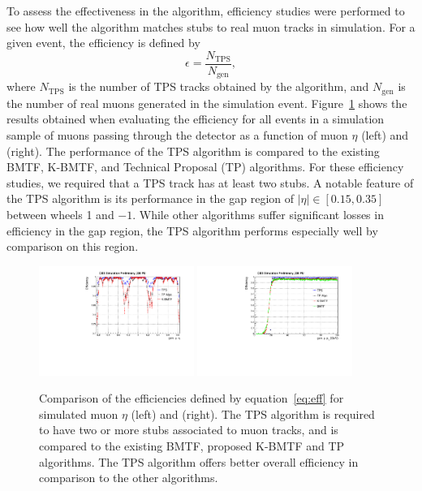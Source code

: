 To assess the effectiveness in the algorithm, efficiency studies were performed to see how well the algorithm matches stubs to real muon tracks in simulation.
For a given event, the efficiency is defined by
\begin{equation}\label{eq:eff}
  \epsilon=\frac{N_\mathrm{TPS}}{N_\mathrm{gen}},
\end{equation}
where $N_\mathrm{TPS}$ is the number of TPS tracks obtained by the algorithm, and $N_\mathrm{gen}$ is the number of real muons generated in the simulation event.
Figure~\ref{fig:eff} shows the results obtained when evaluating the efficiency for all events in a simulation sample of muons passing through the detector as a function of muon $\eta$ (left) and \pt (right).
The performance of the TPS algorithm is compared to the existing BMTF, K-BMTF, and Technical Proposal (TP) algorithms.
For these efficiency studies, we required that a TPS track has at least two stubs.
A notable feature of the TPS algorithm is its performance in the gap region of $|\eta|\in[0.15,0.35]$ between wheels 1 and $-1$.
While other algorithms suffer significant losses in efficiency in the gap region, the TPS algorithm performs especially well by comparison on this region.

\begin{figure}[htbp] %
  \centering
  \includegraphics[width=0.45\textwidth]{fig/TPS/effEta20GeV.pdf}
  \includegraphics[width=0.45\textwidth]{fig/TPS/effPt20GeV.pdf}
  \caption{
    Comparison of the efficiencies defined by equation~\ref{eq:eff} for simulated muon $\eta$ (left) and \pt (right).
    The TPS algorithm is required to have two or more stubs associated to muon tracks, and is compared to the existing BMTF, proposed K-BMTF and TP algorithms.
    The TPS algorithm offers better overall efficiency in comparison to the other algorithms.
  }
  \label{fig:eff}
\end{figure}

